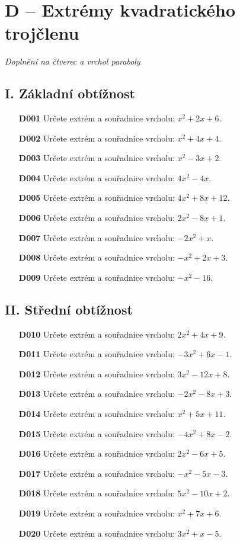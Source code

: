 \documentclass[11pt,a4paper]{article}
\begin{document}
\section*{D -- Extrémy kvadratického trojčlenu}
\textit{Doplnění na čtverec a vrchol paraboly}
\subsection*{I. Základní obtížnost}
\begin{enumerate}[label={},itemsep=5pt]
\item[\textbf{D001}] Určete extrém a souřadnice vrcholu: $x^{2} + 2x + 6$. 
\item[\textbf{D002}] Určete extrém a souřadnice vrcholu: $x^{2} + 4x + 4$. 
\item[\textbf{D003}] Určete extrém a souřadnice vrcholu: $x^{2} - 3x + 2$. 
\item[\textbf{D004}] Určete extrém a souřadnice vrcholu: $4x^{2} - 4x$. 
\item[\textbf{D005}] Určete extrém a souřadnice vrcholu: $4x^{2} + 8x + 12$. 
\item[\textbf{D006}] Určete extrém a souřadnice vrcholu: $2x^{2} - 8x + 1$. 
\item[\textbf{D007}] Určete extrém a souřadnice vrcholu: $- 2x^{2} + x$. 
\item[\textbf{D008}] Určete extrém a souřadnice vrcholu: $- x^{2} + 2x + 3$. 
\item[\textbf{D009}] Určete extrém a souřadnice vrcholu: $- x^{2} - 16$. 
\end{enumerate}
\subsection*{II. Střední obtížnost}
\begin{enumerate}[label={},itemsep=5pt]
\item[\textbf{D010}] Určete extrém a souřadnice vrcholu: $2x^{2} + 4x + 9$.
\item[\textbf{D011}] Určete extrém a souřadnice vrcholu: $- 3x^{2} + 6x - 1$.
\item[\textbf{D012}] Určete extrém a souřadnice vrcholu: $3x^{2} - 12x + 8$.
\item[\textbf{D013}] Určete extrém a souřadnice vrcholu: $- 2x^{2} - 8x + 3$.
\item[\textbf{D014}] Určete extrém a souřadnice vrcholu: $x^{2} + 5x + 11$.
\item[\textbf{D015}] Určete extrém a souřadnice vrcholu: $- 4x^{2} + 8x - 2$.
\item[\textbf{D016}] Určete extrém a souřadnice vrcholu: $2x^{2} - 6x + 5$.
\item[\textbf{D017}] Určete extrém a souřadnice vrcholu: $- x^{2} - 5x - 3$.
\item[\textbf{D018}] Určete extrém a souřadnice vrcholu: $5x^{2} - 10x + 2$.
\item[\textbf{D019}] Určete extrém a souřadnice vrcholu: $x^{2} + 7x + 6$.
\item[\textbf{D020}] Určete extrém a souřadnice vrcholu: $3x^{2} + x - 5$.
\end{enumerate}
\end{document}
